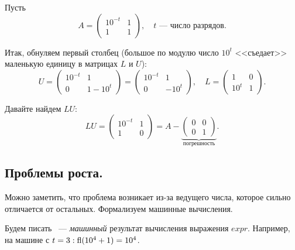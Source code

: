 \begin{exercise}
    Пусть
    \[
        A = \left(
        \begin{array}{cc}
                10^{-t} & 1 \\
                1       & 1
            \end{array}
        \right),\quad t\text{~--- число разрядов.}
    \]

    Итак, обнуляем первый столбец (большое по модулю число $10^t$ <<съедает>> маленькую единицу в матрицах $L$ и $U$):
    \[
        U = \left(
        \begin{array}{cc}
                10^{-t} & 1      \\
                0       & 1-10^t
            \end{array}
        \right)=\left(
        \begin{array}{cc}
                10^{-t} & 1     \\
                0       & -10^t
            \end{array}
        \right), \quad L =\left(
        \begin{array}{cc}
                1    & 0 \\
                10^t & 1
            \end{array}
        \right).
    \]

    Давайте найдем $LU$:
    \[
        LU=\left(
        \begin{array}{cc}
                10^{-t} & 1 \\
                1       & 0
            \end{array}
        \right) = A - \underbrace{\left(
            \begin{array}{cc}
                0 & 0 \\
                0 & 1
            \end{array}
            \right)}_{\text{погрешность}}.
    \]
\end{exercise}

\subsection{Проблемы роста.}

Можно заметить, что проблема возникает из-за ведущего числа, которое сильно отличается от остальных. Формализуем машинные вычисления.
\begin{definition}
    Будем писать ~--- \textit{машинный} результат вычисления выражения $expr$.
    Например, на машине с $t=3: \operatorname{fl}(10^4+1)=10^4$.
\end{definition}

